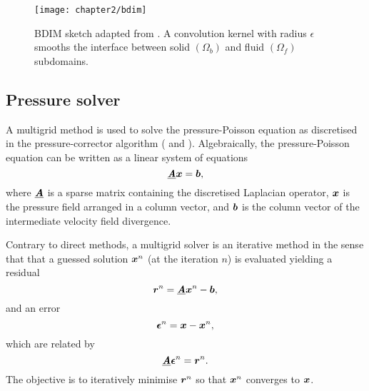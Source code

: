 \documentclass[../main.tex]{subfiles}
\begin{document}
\begin{figure}[t]
\centering
\texttt{[image: chapter2/bdim]}
\caption{BDIM sketch adapted from \cite{Maertens2015}.
A convolution kernel with radius $\epsilon$ smooths the interface between solid $(\Omega_b)$ and fluid $(\Omega_f)$ subdomains.}
\label{fig:bdim}
\end{figure}

\subsection{Pressure solver}

A multigrid method is used to solve the pressure-Poisson equation as discretised in the pressure-corrector algorithm ( and ).
Algebraically, the pressure-Poisson equation can be written as a linear system of equations
\begin{equation}
\underline{\bm{\mathit{A}}}\boldsymbol{x}=\boldsymbol{b},
\end{equation}
where $\underline{\bm{\mathit{A}}}$ is a sparse matrix containing the discretised Laplacian operator, $\boldsymbol{x}$ is the pressure field arranged in a column vector, and $\boldsymbol{b}$ is the column vector of the intermediate velocity field divergence.

Contrary to direct methods, a multigrid solver is an iterative method in the sense that that a guessed solution $\boldsymbol{x}^n$ (at the iteration $n$) is evaluated yielding a residual
\begin{equation}
\boldsymbol{r}^n=\underline{\bm{\mathit{A}}}\boldsymbol{x}^n-\boldsymbol{b},
\end{equation}
and an error
\begin{equation}
\boldsymbol\epsilon^n=\boldsymbol{x}-\boldsymbol{x}^n,
\end{equation}
which are related by
\begin{equation}
\underline{\bm{\mathit{A}}}\boldsymbol\epsilon^n=\boldsymbol{r}^n.
\end{equation}
The objective is to iteratively minimise $\boldsymbol{r}^n$ so that $\boldsymbol{x}^n$ converges to $\boldsymbol{x}$.
\end{document}
